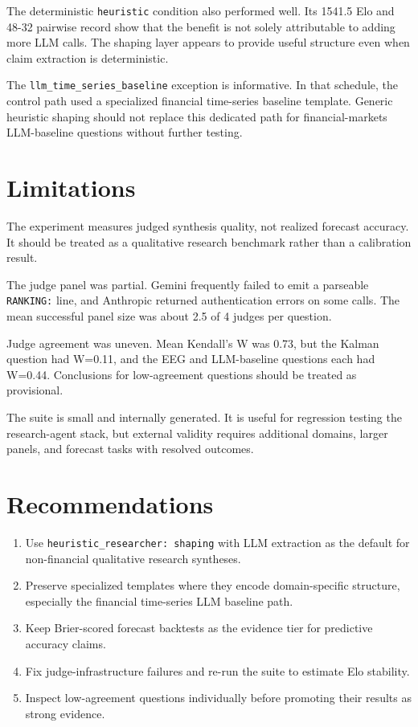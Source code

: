 \documentclass[11pt]{article}
\begin{document}
The deterministic \texttt{heuristic} condition also performed well. Its 1541.5
Elo and 48-32 pairwise record show that the benefit is not solely attributable
to adding more LLM calls. The shaping layer appears to provide useful structure
even when claim extraction is deterministic.

The \texttt{llm\_time\_series\_baseline} exception is informative. In that
schedule, the control path used a specialized financial time-series baseline
template. Generic heuristic shaping should not replace this dedicated path for
financial-markets LLM-baseline questions without further testing.

\section{Limitations}

The experiment measures judged synthesis quality, not realized forecast
accuracy. It should be treated as a qualitative research benchmark rather than a
calibration result.

The judge panel was partial. Gemini frequently failed to emit a parseable
\texttt{RANKING:} line, and Anthropic returned authentication errors on some
calls. The mean successful panel size was about 2.5 of 4 judges per question.

Judge agreement was uneven. Mean Kendall's W was 0.73, but the Kalman question
had W=0.11, and the EEG and LLM-baseline questions each had W=0.44. Conclusions
for low-agreement questions should be treated as provisional.

The suite is small and internally generated. It is useful for regression testing
the research-agent stack, but external validity requires additional domains,
larger panels, and forecast tasks with resolved outcomes.

\section{Recommendations}

\begin{enumerate}[leftmargin=*]
\item Use \texttt{heuristic\_researcher: shaping} with LLM extraction as the
default for non-financial qualitative research syntheses.
\item Preserve specialized templates where they encode domain-specific
structure, especially the financial time-series LLM baseline path.
\item Keep Brier-scored forecast backtests as the evidence tier for predictive
accuracy claims.
\item Fix judge-infrastructure failures and re-run the suite to estimate Elo
stability.
\item Inspect low-agreement questions individually before promoting their
results as strong evidence.
\end{enumerate}
\end{document}
